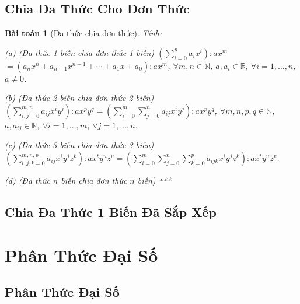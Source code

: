 \documentclass{article}
\numberwithin{equation}{section}
\newtheorem{baitoan}{Bài toán}[section]
\begin{document}

\subsection{Chia Đa Thức Cho Đơn Thức}

\begin{baitoan}[Đa thức chia đơn thức]
	Tính:
	\begin{enumerate*}
		\item[(a)] \emph{(Đa thức 1 biến chia đơn thức 1 biến)} $\left(\sum_{i=0}^n a_ix^i\right):ax^m$\\$= (a_nx^n + a_{n-1}x^{n-1} + \cdots + a_1x + a_0):ax^m$, $\forall m,n\in\mathbb{N}$, $a,a_i\in\mathbb{R}$, $\forall i = 1,\ldots,n$, $a\ne 0$.
		\item[(b)] \emph{(Đa thức 2 biến chia đơn thức 2 biến)} $\left(\sum_{i,j=0}^{m,n} a_{ij}x^iy^j\right):ax^py^q = \left(\sum_{i=0}^m\sum_{j=0}^n a_{ij}x^iy^j\right):ax^py^q$, $\forall m,n,p,q\in\mathbb{N}$, $a,a_{ij}\in\mathbb{R}$, $\forall i = 1,\ldots,m$, $\forall j = 1,\ldots,n$.
		\item[(c)] \emph{(Đa thức 3 biến chia đơn thức 3 biến)} $\left(\sum_{i,j,k=0}^{m,n,p} a_{ij}x^iy^jz^k\right):ax^ty^uz^v = \left(\sum_{i=0}^m\sum_{j=0}^n\sum_{k=0}^p a_{ijk}x^iy^jz^k\right):ax^ty^uz^v$.
		\item[(d)] \emph{(Đa thức $n$ biến chia đơn thức $n$ biến)} ***
	\end{enumerate*}
\end{baitoan}


\subsection{Chia Đa Thức 1 Biến Đã Sắp Xếp}


\section{Phân Thức Đại Số}

\subsection{Phân Thức Đại Số}
\end{document}
